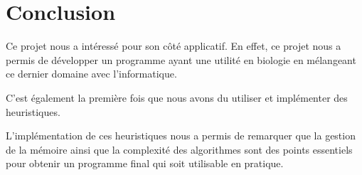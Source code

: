 
\section{Conclusion}

Ce projet nous a intéressé pour son côté applicatif. En effet, ce projet nous a
permis de développer un programme ayant une utilité en biologie en mélangeant
ce dernier domaine avec l'informatique.

C'est également la première fois que nous avons du utiliser et implémenter des
heuristiques.

L'implémentation de ces heuristiques nous a permis de remarquer que la gestion
de la mémoire ainsi que la complexité des algorithmes sont des points essentiels
pour obtenir un programme final qui soit utilisable en pratique.


